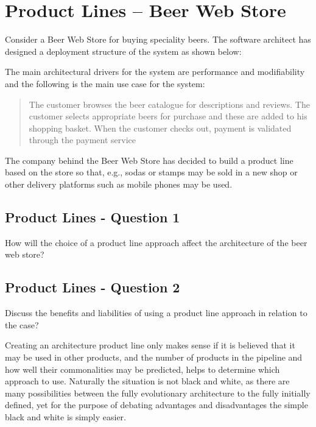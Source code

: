 \section{Product Lines -- Beer Web Store}
Consider a Beer Web Store for buying speciality beers. The software
architect has designed a deployment structure of the system as shown
below:
\begin{figure}[h!]
  \centerline{}
  \label{fig:observation}
\end{figure}
The main architectural drivers for the system are performance and
modifiability and the following is the main use case for the system:
\begin{quote}
  The customer browses the beer catalogue for descriptions and
  reviews. The customer selects appropriate beers for purchase and
  these are added to his shopping basket. When the customer checks
  out, payment is validated through the payment service
\end{quote}

The company behind the Beer Web Store has decided to build a product
line based on the store so that, e.g., sodas or stamps may be sold in
a new shop or other delivery platforms such as mobile phones may be
used.

\subsection{Product Lines - Question 1}

\begin{question}
How will the choice of a product line approach affect the
architecture of the beer web store?
\end{question}


\subsection{Product Lines - Question 2}
\label{sec:pl_q2}
\begin{question}
Discuss the benefits and liabilities of using a product line
approach in relation to the case?
\end{question}

Creating an architecture product line only makes sense if it is believed that it may be used in other products, and the number of products in the pipeline and how well their commonalities may be predicted, helps to determine which approach to use. Naturally the situation is not black and white, as there are many possibilities between the fully evolutionary architecture to the fully initially defined, yet for the purpose of debating advantages and disadvantages the simple black and white is simply easier.


